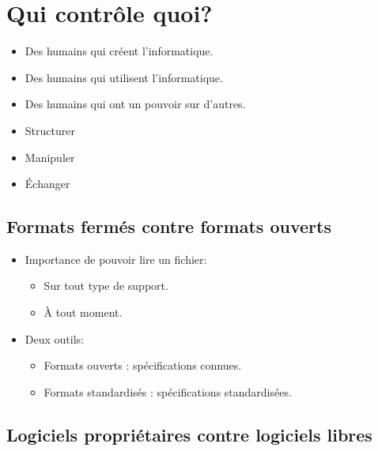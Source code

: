 \section[Contrôler]{Qui contrôle quoi?}


\begin{slide}
	\begin{itemize}
		\item Des humains qui créent l'informatique.
		\item Des humains qui utilisent l'informatique.
		\item Des humains qui ont un pouvoir sur d'autres.
	\end{itemize}
\end{slide}

\begin{slide}

	
	\begin{itemize}
		\item Structurer
		\item Manipuler
		\item Échanger
	\end{itemize}
	

\end{slide}


\subsection{Formats fermés contre formats ouverts}

\begin{slide}
	\begin{itemize}
	\item Importance de pouvoir lire un fichier:
		\begin{itemize}
			\item Sur tout type de support.
			\item À tout moment.
		\end{itemize}
	\item Deux outils:
		\begin{itemize}
			\item Formats ouverts : spécifications connues.
			\item Formats standardisés : spécifications standardisées.
		\end{itemize}
	\end{itemize}
\end{slide}
\subsection{Logiciels propriétaires contre logiciels libres} %

